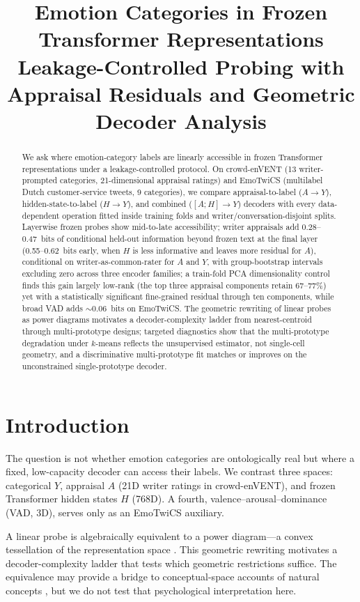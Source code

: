 \documentclass[11pt]{article}
\title{Emotion Categories in Frozen Transformer Representations\\[6pt]
{\large Leakage-Controlled Probing with Appraisal Residuals and Geometric Decoder Analysis}}
\author{}
\date{}
\newcommand{\AtoY}{$A\!\rightarrow\!Y$}
\newcommand{\HtoY}{$H\!\rightarrow\!Y$}
\newcommand{\AHtoY}{$[A;H]\!\rightarrow\!Y$}
\begin{document}
\maketitle

\begin{abstract}
We ask where emotion-category labels are linearly accessible in frozen Transformer representations under a leakage-controlled protocol. On crowd-enVENT (13 writer-prompted categories, 21-dimensional appraisal ratings) and EmoTwiCS (multilabel Dutch customer-service tweets, 9 categories), we compare appraisal-to-label (\AtoY), hidden-state-to-label (\HtoY), and combined (\AHtoY) decoders with every data-dependent operation fitted inside training folds and writer/conversation-disjoint splits. Layerwise frozen probes show mid-to-late accessibility; writer appraisals add 0.28--0.47~bits of conditional held-out information beyond frozen text at the final layer (0.55--0.62~bits early, when $H$ is less informative and leaves more residual for $A$), conditional on writer-as-common-rater for $A$ and $Y$, with group-bootstrap intervals excluding zero across three encoder families; a train-fold PCA dimensionality control finds this gain largely low-rank (the top three appraisal components retain 67--77\%) yet with a statistically significant fine-grained residual through ten components, while broad VAD adds $\sim$0.06~bits on EmoTwiCS. The geometric rewriting of linear probes as power diagrams motivates a decoder-complexity ladder from nearest-centroid through multi-prototype designs; targeted diagnostics show that the multi-prototype degradation under $k$-means reflects the unsupervised estimator, not single-cell geometry, and a discriminative multi-prototype fit matches or improves on the unconstrained single-prototype decoder.
\end{abstract}

\section{Introduction}

The question is not whether emotion categories are ontologically real but where a fixed, low-capacity decoder can access their labels. We contrast three spaces: categorical $Y$, appraisal $A$ (21D writer ratings in crowd-enVENT), and frozen Transformer hidden states $H$ (768D). A fourth, valence--arousal--dominance (VAD, 3D), serves only as an EmoTwiCS auxiliary.

A linear probe is algebraically equivalent to a power diagram---a convex tessellation of the representation space \citep{aurenhammer1987power}. This geometric rewriting motivates a decoder-complexity ladder that tests which geometric restrictions suffice. The equivalence may provide a bridge to conceptual-space accounts of natural concepts \citep{gardenfors2000conceptual,douven-gardenfors-2020}, but we do not test that psychological interpretation here.
\end{document}
